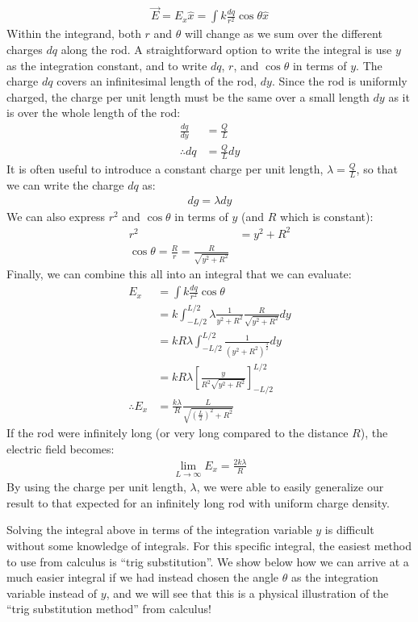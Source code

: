 \begin{example}
\begin{align*}
\vec E = E_x \hat x = \int k\frac{dq}{r^2}\cos\theta \hat x
\end{align*}
Within the integrand, both $r$ and $\theta$ will change as we sum over the different charges $dq$ along the rod. A straightforward option to write the integral is use $y$ as the integration constant, and to write $dq$, $r$, and $\cos\theta$ in terms of $y$. The charge $dq$ covers an infinitesimal length of the rod, $dy$. Since the rod is uniformly charged, the charge per unit length must be the same over a small length $dy$ as it is over the whole length of the rod:
\begin{align*}
\frac{dq}{dy}&=\frac{Q}{L}\\
\therefore dq &= \frac{Q}{L} dy
\end{align*}
It is often useful to introduce a constant charge per unit length, $\lambda=\frac{Q}{L}$, so that we can write the charge $dq$ as:
\begin{align*}
dg = \lambda dy
\end{align*}
We can also express $r^2$ and $\cos\theta$ in terms of $y$ (and $R$ which is constant):
\begin{align*}
r^2 &= y^2+R^2\\
\cos\theta=\frac{R}{r}=\frac{R}{\sqrt{y^2+R^2}}
\end{align*}
Finally, we can combine this all into an integral that we can evaluate:
\begin{align*}
 E_x &=\int k\frac{dq}{r^2}\cos\theta\\
 &=k\int_{-L/2}^{L/2} \lambda \frac{1}{y^2+R^2}\frac{R}{\sqrt{y^2+R^2}} dy\\
 &=kR\lambda\int_{-L/2}^{L/2} \frac{1}{(y^2+R^2)^{\frac{3}{2}}} dy\\
 &=kR\lambda \left[  \frac{y}{R^2\sqrt{y^2+R^2}}\right]_{-L/2}^{L/2}\\
 \therefore E_x &= \frac{k\lambda}{R}\frac{L}{\sqrt{\left(\frac{L}{2}\right)^2+R^2}}  
\end{align*}
If the rod were infinitely long (or very long compared to the distance $R$), the electric field becomes:
\begin{align*}
\lim_{L\to\infty}E_x=\frac{2k\lambda}{R}
\end{align*}
By using the charge per unit length, $\lambda$, we were able to easily generalize our result to that expected for an infinitely long rod with uniform charge density.

Solving the integral above in terms of the integration variable $y$ is difficult without some knowledge of integrals. For this specific integral, the easiest method to use from calculus is ``trig substitution''. We show below how we can arrive at a much easier integral if we had instead chosen the angle $\theta$ as the integration variable instead of $y$, and we will see that this is a physical illustration of the ``trig substitution method'' from calculus!


\end{example}
